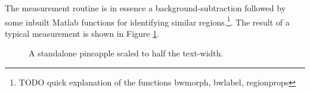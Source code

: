 The measurement routine is in essence a background-subtraction followed by some
inbuilt Matlab functions for identifying similar regions.\footnote{TODO quick
explanation of the functions bwmorph, bwlabel, regionprops}. The result of a
typical measurement is shown in Figure \ref{fig:observation}.

\begin{figure}[h]
\centering
{}
\caption{A standalone pineapple scaled to half the text-width.}
\label{fig:observation}
\end{figure}


